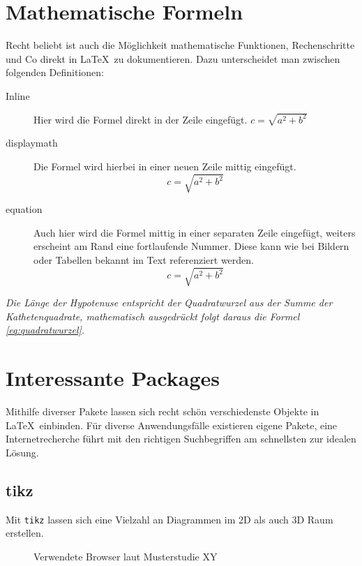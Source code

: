 \section{Mathematische Formeln}
Recht beliebt ist auch die Möglichkeit mathematische Funktionen, Rechenschritte und Co direkt in \LaTeX~zu dokumentieren. Dazu unterscheidet man zwischen folgenden Definitionen:
\begin{description}
	\item[Inline] Hier wird die Formel direkt in der Zeile eingefügt. $ c = \sqrt{a^2 + b^2} $
	\item[displaymath] Die Formel wird hierbei in einer neuen Zeile mittig eingefügt. \begin{displaymath}
	c = \sqrt{a^2 + b^2}
	\end{displaymath}
	\item [equation] Auch hier wird die Formel mittig in einer separaten Zeile eingefügt, weiters erscheint am Rand eine fortlaufende Nummer. Diese kann wie bei Bildern oder Tabellen bekannt im Text referenziert werden.
	\begin{equation} \label{eq:quadratwurzel}
	c = \sqrt{a^2 + b^2}
	\end{equation}
\end{description}

\textit{Die Länge der Hypotenuse entspricht der Quadratwurzel aus der Summe der Kathetenquadrate, mathematisch ausgedrückt folgt daraus die Formel \ref{eq:quadratwurzel}.}

\section{Interessante Packages}
Mithilfe diverser Pakete lassen sich recht schön verschiedenste Objekte in \LaTeX~einbinden. Für diverse Anwendungsfälle existieren eigene Pakete, eine Internetrecherche führt mit den richtigen Suchbegriffen am schnellsten zur idealen Lösung.
\subsection*{tikz}
Mit \verb|tikz| lassen sich eine Vielzahl an Diagrammen im 2D als auch 3D Raum erstellen. 
\begin{figure}[H]
	\centering
	\caption{Verwendete Browser laut Musterstudie XY}
\end{figure}


